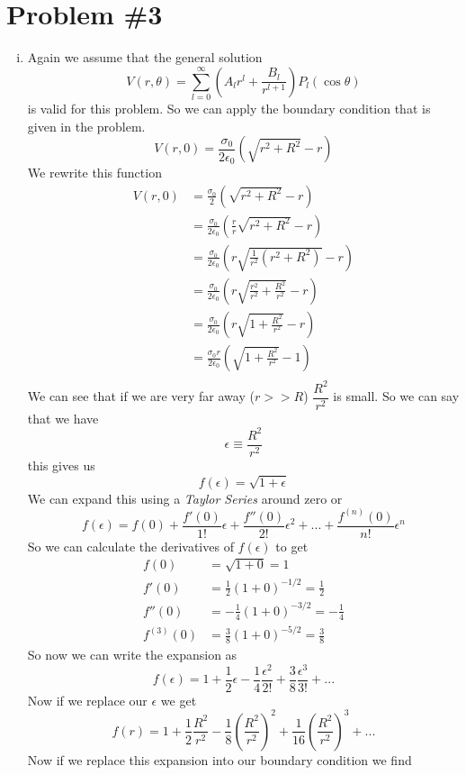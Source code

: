 \documentclass[11pt]{article}
\numberwithin{equation}{section}
\begin{document}
\section{Problem \#3}
\begin{enumerate}[(i)]
\item
Again we assume that the general solution
$$V(r,\theta) = \sum_{l=0}^{\infty}\left(A_lr^l+\frac{B_l}{r^{l+1}}\right)P_l(\cos\theta)$$
is valid for this problem. So we can apply the boundary condition that is given in the problem.
$$V(r,0) = \frac{\sigma_0}{2\epsilon_0}\left(\sqrt{r^2+R^2}-r\right)$$
We rewrite this function
\begin{align*}
V(r,0) &= \frac{\sigma_0}{2}\left(\sqrt{r^2+R^2}-r\right)\\
&= \frac{\sigma_0}{2\epsilon_0}\left(\frac{r}{r}\sqrt{r^2+R^2}-r\right)\\
&= \frac{\sigma_0}{2\epsilon_0}\left(r\sqrt{\frac{1}{r^2}(r^2+R^2)}-r\right)\\
&= \frac{\sigma_0}{2\epsilon_0}\left(r\sqrt{\frac{r^2}{r^2}+\frac{R^2}{r^2}}-r\right)\\
&= \frac{\sigma_0}{2\epsilon_0}\left(r\sqrt{1+\frac{R^2}{r^2}}-r\right)\\
&= \frac{\sigma_0r}{2\epsilon_0}\left(\sqrt{1+\frac{R^2}{r^2}}-1\right)\\
\end{align*}
We can see that if we are very far away ($r>>R$) $\dfrac{R^2}{r^2}$ is small. So we can say that we have 
$$\epsilon \equiv \frac{R^2}{r^2}$$
this gives us
$$f(\epsilon)=\sqrt{1+\epsilon}$$
We can expand this using a \emph{Taylor Series} around zero or
$$f(\epsilon) = f(0) + \frac{f'(0)}{1!}\epsilon + \frac{f''(0)}{2!}\epsilon^2 + ...+ \frac{f^{(n)}(0)}{n!}\epsilon^n$$
So we can calculate the derivatives of $f(\epsilon)$ to get
\begin{align*}
f(0) &= \sqrt{1+0} = 1\\
f'(0) &= \frac{1}{2}(1+0)^{-1/2} = \frac{1}{2}\\
f''(0) &= -\frac{1}{4}(1+0)^{-3/2} = -\frac{1}{4}\\
f^{(3)}(0) &= \frac{3}{8}(1+0)^{-5/2} = \frac{3}{8}
\end{align*}
So now we can write the expansion as
$$f(\epsilon) = 1+\frac{1}{2}\epsilon-\frac{1}{4}\frac{\epsilon^2}{2!}+\frac{3}{8}\frac{\epsilon^3}{3!}+...$$
Now if we replace our $\epsilon$ we get
$$f(r) = 1+\frac{1}{2}\frac{R^2}{r^2}-\frac{1}{8}\left(\frac{R^2}{r^2}\right)^2+\frac{1}{16}\left(\frac{R^2}{r^2}\right)^3+...$$
Now if we replace this expansion into our boundary condition we find

\end{enumerate}
\end{document}
